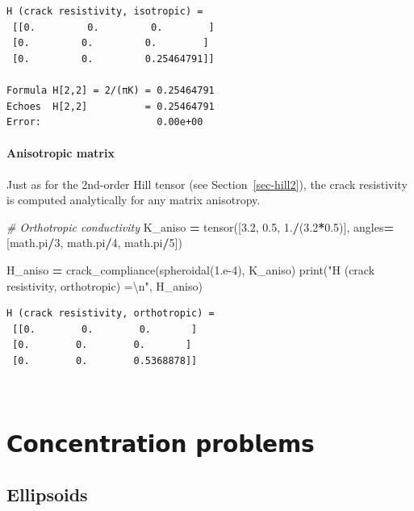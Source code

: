 \documentclass[
  a4paper,
  numbers=noendperiod,
  DIV=12]{scrreprt}
\newenvironment{Shaded}{\begin{snugshade}}{\end{snugshade}}
\newcommand{\BuiltInTok}[1]{#1}
\newcommand{\CharTok}[1]{\textcolor[rgb]{0.31,0.60,0.02}{#1}}
\newcommand{\CommentTok}[1]{\textcolor[rgb]{0.56,0.35,0.01}{\textit{#1}}}
\newcommand{\DecValTok}[1]{\textcolor[rgb]{0.00,0.00,0.81}{#1}}
\newcommand{\FloatTok}[1]{\textcolor[rgb]{0.00,0.00,0.81}{#1}}
\newcommand{\NormalTok}[1]{#1}
\newcommand{\OperatorTok}[1]{\textcolor[rgb]{0.81,0.36,0.00}{\textbf{#1}}}
\newcommand{\StringTok}[1]{\textcolor[rgb]{0.31,0.60,0.02}{#1}}
\begin{document}
\begin{verbatim}
H (crack resistivity, isotropic) =
 [[0.         0.         0.        ]
 [0.         0.         0.        ]
 [0.         0.         0.25464791]]

Formula H[2,2] = 2/(πK) = 0.25464791
Echoes  H[2,2]          = 0.25464791
Error:                    0.00e+00
\end{verbatim}

\subsection{Anisotropic matrix}\label{anisotropic-matrix-1}

Just as for the 2nd-order Hill tensor (see Section~\ref{sec-hill2}), the
crack resistivity is computed analytically for any matrix anisotropy.

\begin{Shaded}
\begin{Highlighting}[]
\CommentTok{\# Orthotropic conductivity}
\NormalTok{K\_aniso }\OperatorTok{=}\NormalTok{ tensor([}\FloatTok{3.2}\NormalTok{, }\FloatTok{0.5}\NormalTok{, }\FloatTok{1.}\OperatorTok{/}\NormalTok{(}\FloatTok{3.2}\OperatorTok{*}\FloatTok{0.5}\NormalTok{)], angles}\OperatorTok{=}\NormalTok{[math.pi}\OperatorTok{/}\DecValTok{3}\NormalTok{, math.pi}\OperatorTok{/}\DecValTok{4}\NormalTok{, math.pi}\OperatorTok{/}\DecValTok{5}\NormalTok{])}

\NormalTok{H\_aniso }\OperatorTok{=}\NormalTok{ crack\_compliance(spheroidal(}\FloatTok{1.e{-}4}\NormalTok{), K\_aniso)}
\BuiltInTok{print}\NormalTok{(}\StringTok{"H (crack resistivity, orthotropic) =}\CharTok{\textbackslash{}n}\StringTok{"}\NormalTok{, H\_aniso)}
\end{Highlighting}
\end{Shaded}

\begin{verbatim}
H (crack resistivity, orthotropic) =
 [[0.        0.        0.       ]
 [0.        0.        0.       ]
 [0.        0.        0.5368878]]
\end{verbatim}

\(\,\)

\part{𝗖𝗼𝗻𝗰𝗲𝗻𝘁𝗿𝗮𝘁𝗶𝗼𝗻 𝗽𝗿𝗼𝗯𝗹𝗲𝗺𝘀}

\chapter{Ellipsoids}\label{sec-concentration_tensors}
\end{document}
